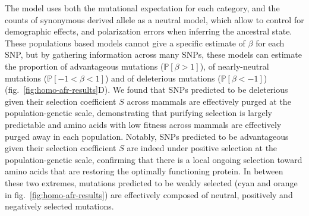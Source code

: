 \documentclass{article}
\newcommand{\proba}{\mathbb{P}}
\newcommand{\Sphy}{S}
\newcommand{\Spop}{\beta}
\newcommand{\polyDel}{\Spop < -1}
\newcommand{\polyNeutral}{-1 < \Spop < 1}
\newcommand{\polyAdv}{ \Spop > 1}
\newcommand{\PpolyDel}{\proba \left[ \polyDel \right]}
\newcommand{\PpolyNeutral}{\proba \left[ \polyNeutral \right]}
\newcommand{\PpolyAdv}{\proba \left[ \polyAdv \right]}
\begin{document}
    The model uses both the mutational expectation for each category, and the counts of synonymous derived allele as a neutral model, which allow to control for demographic effects, and polarization errors when inferring the ancestral state.
    These populations based models cannot give a specific estimate of $\Spop$ for each SNP, but by gathering information across many SNPs, these models can estimate the proportion of advantageous mutations ($\PpolyAdv$), of nearly-neutral mutations ($\PpolyNeutral$) and of deleterious mutations ($\PpolyDel$) (fig.~\ref{fig:homo-afr-results}D).
    We found that SNPs predicted to be deleterious given their selection coefficient $\Sphy$ across mammals are effectively purged at the population-genetic scale, demonstrating that purifying selection is largely predictable and amino acids with low fitness across mammals are effectively purged away in each population.
    Notably, SNPs predicted to be advantageous given their selection coefficient $\Sphy$ are indeed under positive selection at the population-genetic scale, confirming that there is a local ongoing selection toward amino acids that are restoring the optimally functioning protein.
    In between these two extremes, mutations predicted to be weakly selected (cyan and orange in fig.~\ref{fig:homo-afr-results}) are effectively composed of neutral, positively and negatively selected mutations.
\end{document}

